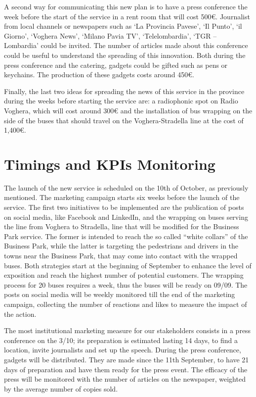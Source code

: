 A second way for communicating this new plan is to have a press conference the week before the start of the service in a rent room that will cost 500€. Journalist from local channels or newspapers such as ‘La Provincia Pavese’, ‘Il Punto’, ‘il Giorno’, ‘Voghera News’, ‘Milano Pavia TV’, ‘Telelombardia’, ‘TGR – Lombardia’ could be invited. The number of articles made about this conference could be useful to understand the spreading of this innovation. Both during the press conference and the catering, gadgets could be gifted such as pens or keychains. The production of these gadgets costs around 450€.

Finally, the last two ideas for spreading the news of this service in the province during the weeks before starting the service are: a radiophonic spot on Radio Voghera, which will cost around 300€ and the installation of bus wrapping on the side of the buses that should travel on the Voghera-Stradella line at the cost of 1,400€.


\section{Timings and KPIs Monitoring}

The launch of the new service is scheduled on the 10th of October, as previously mentioned. The marketing campaign starts six weeks before the launch of the service. The first two initiatives to be implemented are the publication of posts on social media, like Facebook and LinkedIn, and the wrapping on buses serving the line from Voghera to Stradella, line that will be modified for the Business Park service. The former is intended to reach the so called “white collars” of the Business Park, while the latter is targeting the pedestrians and drivers in the towns near the Business Park, that may come into contact with the wrapped buses. Both strategies start at the beginning of September to enhance the level of exposition and reach the highest number of potential customers. The wrapping process for 20 buses requires a week, thus the buses will be ready on 09/09. The posts on social media will be weekly monitored till the end of the marketing campaign, collecting the number of reactions and likes to measure the impact of the action.

The most institutional marketing measure for our stakeholders consists in a press conference on the 3/10; its preparation is estimated lasting 14 days, to find a location, invite journalists and set up the speech. During the press conference, gadgets will be distributed. They are made since the 11th September, to have 21 days of preparation and have them ready for the press event. The efficacy of the press will be monitored with the number of articles on the newspaper, weighted by the average number of copies sold.

